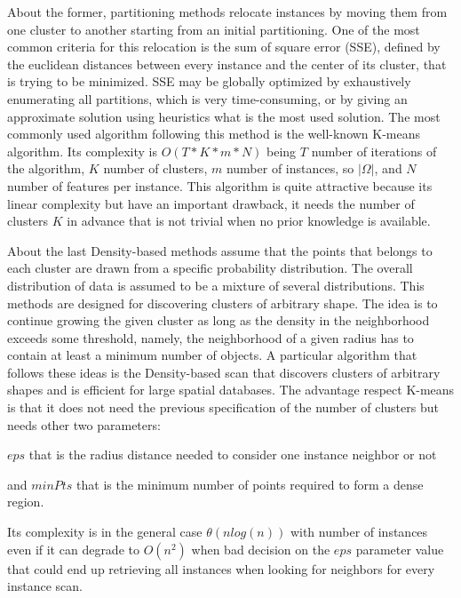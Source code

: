 About the former, partitioning methods relocate instances by moving them from
one cluster to another starting from an initial partitioning.
One of the most common criteria for this relocation is the sum of square error
(SSE), defined by the euclidean distances between every instance and the center
of its cluster, that is trying to be minimized. SSE may be globally optimized by 
exhaustively enumerating all partitions, which is very time-consuming, 
or by giving an approximate solution using heuristics what is the most used
solution. The most commonly used algorithm following this method is the 
well-known K-means algorithm. Its complexity is $O(T*K*m*N)$ being $T$ number of
iterations of the algorithm, $K$ number of clusters, $m$ number of instances, so
$|\Omega|$, and $N$ number of features per instance. This algorithm is quite attractive because
its linear complexity but have an important drawback, it needs the number of
clusters $K$ in advance that is not trivial when no prior knowledge is
available.

About the last Density-based methods assume that the points that belongs to
each cluster are
drawn from a specific probability distribution. The overall distribution of data
is assumed to be a mixture of several distributions. This methods are designed
for discovering clusters of arbitrary shape. The idea is to continue growing the
given cluster as long as the density in the neighborhood exceeds some threshold,
namely, the neighborhood of a given radius has to contain at least a minimum
number of objects. A particular algorithm that follows these ideas is the
Density-based scan that discovers clusters of arbitrary shapes and is efficient
for large spatial databases. The advantage respect K-means is that it does not
need the previous specification of the number of clusters but needs other two
parameters:
\begin{enumerate*}[label=\roman*)]
  \item $eps$ that is the radius distance needed to consider one instance neighbor
    or not 
  \item and $minPts$ that is the minimum number of points required to form a dense
    region.
\end{enumerate*}
Its complexity is in the general case $\theta(nlog(n))$ with number of instances
even if it can degrade to $O(n^{2})$ when bad decision on the $eps$ parameter
value that could end up retrieving all instances when looking for neighbors for
every instance scan.

